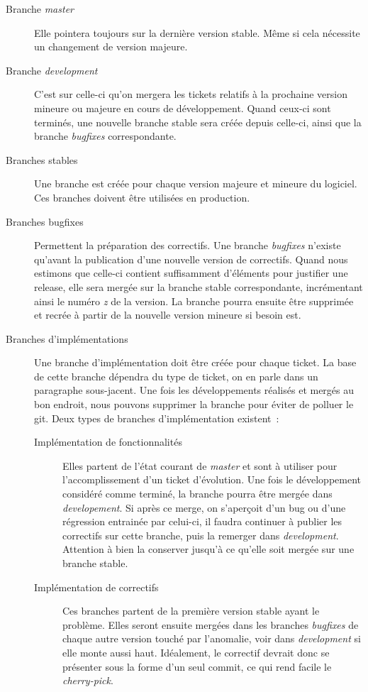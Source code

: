 \begin{description}
	\item[Branche \emph{master}]
		Elle pointera toujours sur la dernière version stable.
		Même si cela nécessite un changement de version majeure.
	\item[Branche \emph{development}]
		C'est sur celle-ci qu'on mergera les tickets relatifs à la prochaine version mineure ou majeure en cours de développement.
		Quand ceux-ci sont terminés, une nouvelle branche stable sera créée depuis celle-ci, ainsi que la branche \emph{bugfixes} correspondante.
	\item[Branches stables]
		Une branche est créée pour chaque version majeure et mineure du logiciel. Ces branches doivent être utilisées en production.
	\item[Branches bugfixes]
		Permettent la préparation des correctifs.
		Une branche \emph{bugfixes} n'existe qu'avant la publication d'une nouvelle version de correctifs.
		Quand nous estimons que celle-ci contient suffisamment d'éléments pour justifier une release, elle sera mergée sur la branche stable correspondante, incrémentant ainsi le numéro \emph{z} de la version.
		La branche pourra ensuite être supprimée et recrée à partir de la nouvelle version mineure si besoin est.
	\item[Branches d'implémentations]
		Une branche d'implémentation doit être créée pour chaque ticket.
		La base de cette branche dépendra du type de ticket, on en parle dans un paragraphe sous-jacent.
		Une fois les développements réalisés et mergés au bon endroit, nous pouvons supprimer la branche pour éviter de polluer le git.
		Deux types de branches d'implémentation existent~:
		\begin{description}
			\item[Implémentation de fonctionnalités]
				Elles partent de l'état courant de \emph{master} et sont à utiliser pour l'accomplissement d'un ticket d'évolution.
				Une fois le développement considéré comme terminé, la branche pourra être mergée dans \emph{developement}.
				Si après ce merge, on s'aperçoit d'un bug ou d'une régression entrainée par celui-ci, il faudra continuer à publier les correctifs sur cette branche, puis la remerger dans \emph{development}.
				Attention à bien la conserver jusqu'à ce qu'elle soit mergée sur une branche stable.
			\item[Implémentation de correctifs]
				Ces branches partent de la première version stable ayant le problème.
				Elles seront ensuite mergées dans les branches \emph{bugfixes} de chaque autre version touché par l'anomalie, voir dans \emph{development} si elle monte aussi haut.
				Idéalement, le correctif devrait donc se présenter sous la forme d'un seul commit, ce qui rend facile le \emph{cherry-pick}.
		\end{description}
\end{description}

